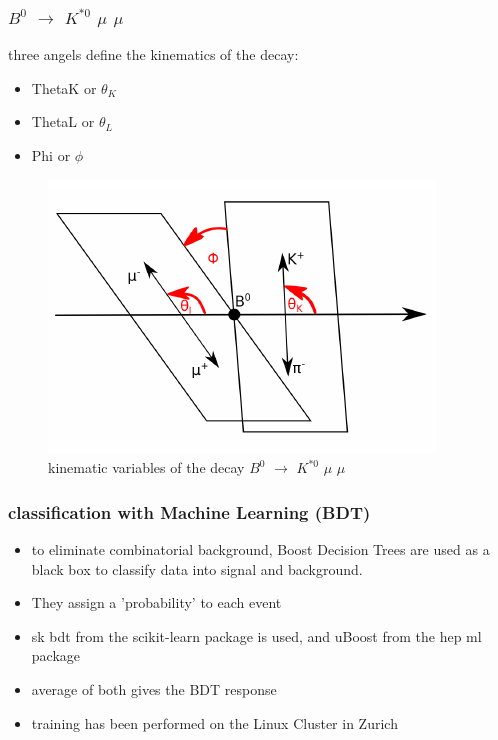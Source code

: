 \documentclass{beamer}
\begin{document}
\begin{frame}
\frametitle{$B^0$ $\rightarrow$ $K^{*0}$ $\mu$ $\mu$}
three angels define the kinematics of the decay:
\begin{itemize}
  \item ThetaK or $\theta_K$
  \item ThetaL or $\theta_L$
  \item Phi or $\phi$
\end{itemize}

\begin{figure}
  \includegraphics[width=0.6\linewidth]{angels}
  \caption{kinematic variables of the decay $B^0$ $\rightarrow$ $K^{*0}$ $\mu$ $\mu$}
\end{figure}

\end{frame}


\begin{frame}
  \frametitle{classification with Machine Learning (BDT)}
  \begin{itemize}
    \item to eliminate combinatorial background, Boost Decision Trees are used as a black box to classify data into signal and background.
    \item They assign a 'probability' to each event
    \item sk bdt from the scikit-learn package is used, and uBoost from the hep ml package
    \item average of both gives the BDT response
    \item training has been performed on the Linux Cluster in Zurich
  \end{itemize}
\end{frame}
\end{document}
